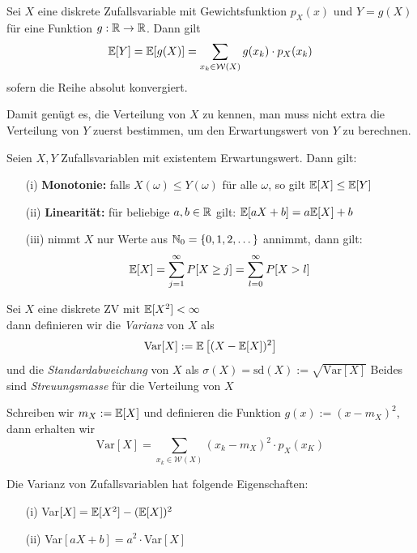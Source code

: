 \begin{satz}
Sei $X$ eine diskrete Zufallsvariable mit Gewichtsfunktion $p_X(x)$ und $Y = g(X)$ für eine Funktion $g:\mathbb{R} \to \mathbb{R}$. Dann gilt
$$ \mathbb{E}[Y] = \mathbb{E}[g(X)] = \sum_{x_k \in \mathcal{W}(X)} g(x_k) \cdot p_X(x_k)$$
sofern die Reihe absolut konvergiert.
\end{satz}
Damit genügt es, die Verteilung von $X$ zu kennen, man muss nicht extra die Verteilung von $Y$ zuerst bestimmen, um den Erwartungswert von $Y$ zu berechnen.

\begin{satz}
Seien $X,Y$ Zufallsvariablen mit existentem Erwartungswert. Dann gilt:
\begin{itemize}
\item[(i)] \textbf{Monotonie:} falls $X(\omega) \leq Y(\omega) $ für alle $\omega$, so gilt $ \mathbb{E}[X] \leq \mathbb{E}[Y]$
\item[(ii)] \textbf{Linearität:} für beliebige $a,b \in \mathbb{R}$ gilt: $\mathbb{E}[aX+b] = a\mathbb{E}[X] + b$
\item[(iii)] nimmt $X$ nur Werte aus $\mathbb{N}_0 = \{0,1,2,\dots\}$ annimmt, dann gilt:
$$ \mathbb{E}[X] = \sum_{j=1}^\infty P[X \geq j] = \sum_{l = 0}^\infty P[X > l]$$
\end{itemize}
\end{satz}

\begin{definition}
Sei $X$ eine diskrete ZV mit $\mathbb{E}[X^2] < \infty$\\ dann definieren wir die \textit{Varianz} von $X$ als
$$ \mbox{Var}[X] := \mathbb{E}\left[(X - \mathbb{E}[X])^2\right]$$ und die \textit{Standardabweichung} von $X$ als
$ \sigma(X) = \mbox{sd}(X) := \sqrt{\mbox{Var}[X]}$
Beides sind \textit{Streuungsmasse} für die Verteilung von $X$
\end{definition}

Schreiben wir $m_X := \mathbb{E}[X]$ und definieren die Funktion $g(x):= (x-m_X)^2$, dann erhalten wir
$$ \mbox{Var}[X] = \sum_{x_k \in \mathcal{W}(X)} (x_k - m_X)^2 \cdot p_X(x_K)$$

\begin{lemma}
Die Varianz von Zufallsvariablen hat folgende Eigenschaften:
\begin{itemize}
\item[(i)] Var$[X] = \mathbb{E}[X^2] - (\mathbb{E}[X])^2$
\item[(ii)] Var$[aX + b] = a^2 \cdot $Var$[X]$
\end{itemize}
\end{lemma}


